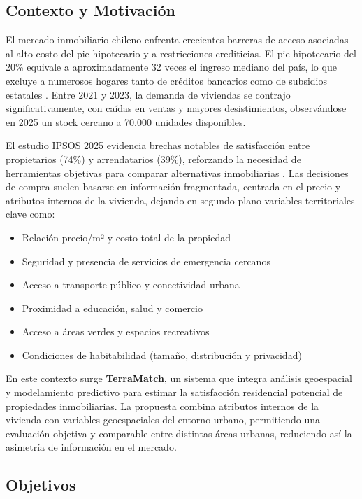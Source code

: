 \documentclass[11pt,letterpaper]{article}
\begin{document}
\subsection{Contexto y Motivación}

El mercado inmobiliario chileno enfrenta crecientes barreras de acceso asociadas al alto costo del pie hipotecario y a restricciones crediticias. El pie hipotecario del 20\% equivale a aproximadamente 32 veces el ingreso mediano del país, lo que excluye a numerosos hogares tanto de créditos bancarios como de subsidios estatales \cite{biobio_ciper_2025}. Entre 2021 y 2023, la demanda de viviendas se contrajo significativamente, con caídas en ventas y mayores desistimientos, observándose en 2025 un stock cercano a 70.000 unidades disponibles.

El estudio IPSOS 2025 evidencia brechas notables de satisfacción entre propietarios (74\%) y arrendatarios (39\%), reforzando la necesidad de herramientas objetivas para comparar alternativas inmobiliarias \cite{ipsos_monitor_2025}. Las decisiones de compra suelen basarse en información fragmentada, centrada en el precio y atributos internos de la vivienda, dejando en segundo plano variables territoriales clave como:

\begin{itemize}
    \item Relación precio/m² y costo total de la propiedad
    \item Seguridad y presencia de servicios de emergencia cercanos
    \item Acceso a transporte público y conectividad urbana
    \item Proximidad a educación, salud y comercio
    \item Acceso a áreas verdes y espacios recreativos
    \item Condiciones de habitabilidad (tamaño, distribución y privacidad)
\end{itemize}

En este contexto surge \textbf{TerraMatch}, un sistema que integra análisis geoespacial y modelamiento predictivo para estimar la satisfacción residencial potencial de propiedades inmobiliarias. La propuesta combina atributos internos de la vivienda con variables geoespaciales del entorno urbano, permitiendo una evaluación objetiva y comparable entre distintas áreas urbanas, reduciendo así la asimetría de información en el mercado.

\subsection{Objetivos}
\end{document}
